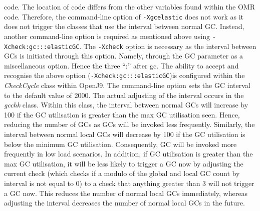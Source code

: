 code. The location of code differs from the other variables found within
the OMR code. Therefore, the command-line option of \verb|-Xgcelastic| does not
work as it does not trigger the classes that use the interval between
normal GC. 
\newline\newline
Instead, another command-line option is required as mentioned
above using \verb|-Xcheck:gc:::elasticGC|. The \verb|-Xcheck| option is necessary as
the interval between GCs is initiated through this option. Namely,
through the GC parameter as a miscellaneous option. Hence the three ``:''
after gc. The ability to accept and recognise the above option
(\verb|-Xcheck:gc:::elasticGC|)is configured within the \emph{CheckCycle} class within OpenJ9. 
\newline\newline
The command-line option sets the GC interval to the
default value of 2000. The actual adjusting of the interval occurs in the
\emph{gcchk} class. Within this class, the interval between normal GCs will increase
by 100 if the GC utilisation is greater than the max GC utilisation
seen. Hence, reducing the number of GCs as GCs will be invoked less
frequently. Similarly, the interval between normal local GCs will
decrease by 100 if the GC utilisation is below the minimum GC
utilisation. Consequently, GC will be invoked more frequently in low load
scenarios. 
\newline\newline
In addition, if GC utilisation is greater than the max GC
utilisation, it will be less likely to trigger a GC now by adjusting the
current check (which checks if a modulo of the global and local GC count
by interval is not equal to 0) to a check that anything greater than 3
will not trigger a GC now. This reduces the number of normal local GCs
immediately, whereas adjusting the interval decreases the number of
normal local GCs in the future.


